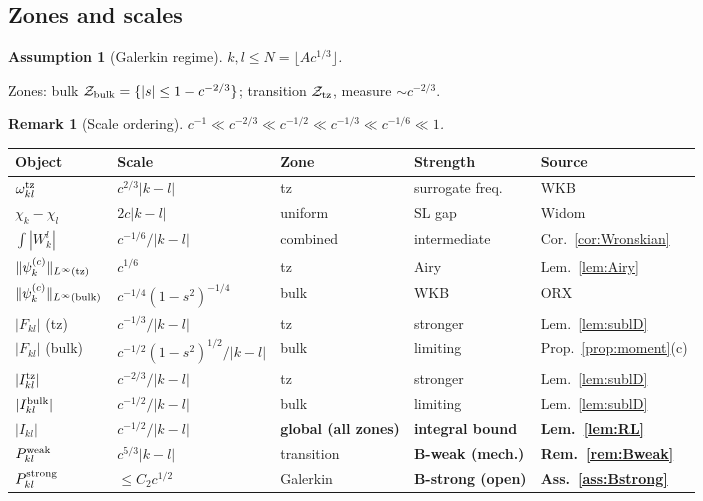 \documentclass[12pt,a4paper]{article}
\newtheorem{remark}[theorem]{Remark}
\newtheorem{assumption}[theorem]{Assumption}
\newcommand{\pswf}[1]{\psi_{#1}^{(c)}}
\begin{document}
\subsection{Zones and scales}

\begin{assumption}[Galerkin regime]\label{ass:G}
$k,l\leq N=\lfloor Ac^{1/3}\rfloor$.
\end{assumption}

Zones: bulk $\mathcal{Z}_{\rm bulk}=\{|s|\leq1-c^{-2/3}\}$;
transition $\mathcal{Z}_{\rm tz}$, measure $\sim c^{-2/3}$.

\begin{remark}[Scale ordering]\label{rem:ordering}
$c^{-1}\ll c^{-2/3}\ll c^{-1/2}\ll c^{-1/3}\ll c^{-1/6}\ll 1$.
\end{remark}

\begin{table}[h]
\centering\renewcommand{\arraystretch}{1.3}
\begin{tabular}{lllll}
\hline
\textbf{Object}&\textbf{Scale}&\textbf{Zone}
  &\textbf{Strength}&\textbf{Source}\\
\hline
$\omega_{kl}^{\rm tz}$&$c^{2/3}|k-l|$&tz&surrogate freq.&WKB\\
$\chi_k-\chi_l$&$2c|k-l|$&uniform&SL gap&Widom\\
$\int|W_k^l|$&$c^{-1/6}/|k-l|$&combined&intermediate
  &Cor.~\ref{cor:Wronskian}\\
$\|\pswf{k}\|_{L^\infty({\rm tz})}$&$c^{1/6}$&tz&Airy
  &Lem.~\ref{lem:Airy}\\
$\|\pswf{k}\|_{L^\infty({\rm bulk})}$&$c^{-1/4}(1{-}s^2)^{-1/4}$
  &bulk&WKB&ORX\\
$|F_{kl}|$ (tz)&$c^{-1/3}/|k-l|$&tz&stronger
  &Lem.~\ref{lem:sublD}\\
$|F_{kl}|$ (bulk)&$c^{-1/2}(1{-}s^2)^{1/2}/|k-l|$&bulk&limiting
  &Prop.~\ref{prop:moment}(c)\\
$|I_{kl}^{\rm tz}|$&$c^{-2/3}/|k-l|$&tz&stronger
  &Lem.~\ref{lem:sublD}\\
$|I_{kl}^{\rm bulk}|$&$c^{-1/2}/|k-l|$&bulk&limiting
  &Lem.~\ref{lem:sublD}\\
\hline
$|I_{kl}|$&$c^{-1/2}/|k-l|$&\textbf{global (all zones)}
  &\textbf{integral bound}&\textbf{Lem.~\ref{lem:RL}}\\
$P_{kl}^{\rm weak}$&$c^{5/3}|k-l|$&transition
  &\textbf{B-weak (mech.)}&\textbf{Rem.~\ref{rem:Bweak}}\\
$P_{kl}^{\rm strong}$&$\leq C_2c^{1/2}$&Galerkin
  &\textbf{B-strong (open)}&\textbf{Ass.~\ref{ass:Bstrong}}\\

\end{tabular}
\end{table}
\end{document}
